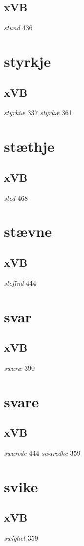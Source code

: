 \documentclass[a4paper,twocolumn]{article}
\begin{document}
\subsection{xVB}
\label{sec:org488f392}
\emph{stund} 436 
\section{styrkje}
\label{sec:org48074c1}
\subsection{xVB}
\label{sec:orga0e59c2}
\emph{styrkiæ} 337 \emph{styrkæ} 361 
\section{stæthje}
\label{sec:org42f423d}
\subsection{xVB}
\label{sec:org7172994}
\emph{sted} 468 
\section{stævne}
\label{sec:org70ce06f}
\subsection{xVB}
\label{sec:org3e2cec8}
\emph{steffnd} 444 
\section{svar}
\label{sec:orgda251b8}
\subsection{xVB}
\label{sec:org36bc1b4}
\emph{swaræ} 390 
\section{svare}
\label{sec:org7dd4f71}
\subsection{xVB}
\label{sec:org8907cf1}
\emph{swarede} 444 \emph{swaredhe} 359 
\section{svike}
\label{sec:orgd1d80e7}
\subsection{xVB}
\label{sec:orgd87fc58}
\emph{swighet} 359 
\end{document}
